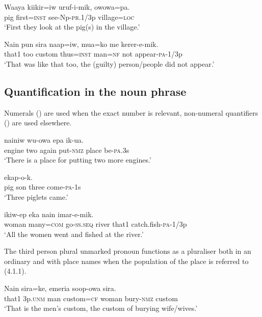 \ea%
\label{ex:x1284}
\gll Waaya  kiikir=iw  uruf-i-mik,  owowa=pa. \\
pig  first=\textsc{inst}  see-Np-\textsc{pr}.1/3p  village=\textsc{loc} \\
\glt `First they look at the pig(s) in the village.'
\z

\ea%
\label{ex:x1285}
\gll Nain  pun  sira  naap=iw,  mua=ko  me  kerer-e-mik. \\
that1  too  custom  thus=\textsc{inst}  man=\textsc{nf}  not  appear-\textsc{pa}-1/3p\\
\glt `That was like that too, the (guilty) person/people did not appear.'
\z

\subsection{Quantification in the noun phrase}
{}
Numerals () are used when the exact number is relevant, non-numeral quantifiers () are used elsewhere.  

\ea%
\label{ex:x1286}
\gll {}   nainiw  wu-owa  epa  ik-ua. \\
engine  two  again  put-\textsc{nmz}  place  be-\textsc{pa}.3s\\
\glt `There is a place for putting two more engines.'
\z

\ea%
\label{ex:x1308}
\gll {}     ekap-o-k. \\
pig  son  three  come-\textsc{pa}-1s\\
\glt `Three piglets came.'
\z

\ea%
\label{ex:x1287}
\gll {}    ikiw-ep  eka  nain  imar-e-mik. \\
woman  many=\textsc{com}  go-\textsc{ss}.\textsc{seq}  river  that1  catch.fish-\textsc{pa}-1/3p\\
\glt `All the women went and fished at the river.'
\z

The third person plural unmarked pronoun functions as a pluraliser both in an ordinary  and with place names when the population of the place is referred to (4.1.1). 

\ea%
\label{ex:x1288}
\gll Nain     sira=ke,  emeria  soop-owa  sira. \\
that1  3p.\textsc{unm}  man  custom=\textsc{cf}  woman  bury-\textsc{nmz}  custom\\
\glt `That is the men's custom, the custom of burying wife/wives.'
\z

